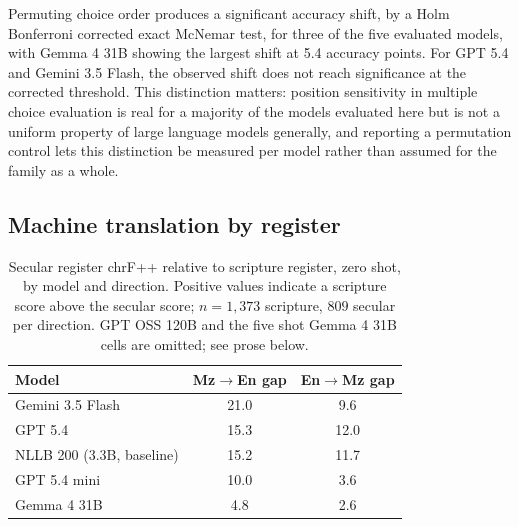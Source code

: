 \documentclass[11pt,a4paper]{article}
\begin{document}
Permuting choice order produces a significant accuracy shift, by a Holm Bonferroni corrected exact McNemar test, for three of the five evaluated models, with Gemma 4 31B showing the largest shift at 5.4 accuracy points. For GPT 5.4 and Gemini 3.5 Flash, the observed shift does not reach significance at the corrected threshold. This distinction matters: position sensitivity in multiple choice evaluation is real for a majority of the models evaluated here but is not a uniform property of large language models generally, and reporting a permutation control lets this distinction be measured per model rather than assumed for the family as a whole.

\subsection{Machine translation by register}
\label{sec:mt-results}

\begin{table}[t]
\centering
\small
\begin{tabular}{lcc}
\toprule
\textbf{Model} & \textbf{Mz$\to$En gap} & \textbf{En$\to$Mz gap} \\
\midrule
Gemini 3.5 Flash & 21.0 & 9.6 \\
GPT 5.4 & 15.3 & 12.0 \\
NLLB 200 (3.3B, baseline) & 15.2 & 11.7 \\
GPT 5.4 mini & 10.0 & 3.6 \\
Gemma 4 31B & 4.8 & 2.6 \\
\bottomrule
\end{tabular}
\caption{Secular register chrF++ relative to scripture register, zero shot, by model and direction. Positive values indicate a scripture score above the secular score; $n{=}1{,}373$ scripture, $809$ secular per direction. GPT OSS 120B and the five shot Gemma 4 31B cells are omitted; see prose below.}
\label{tab:mt-register}
\end{table}
\end{document}

